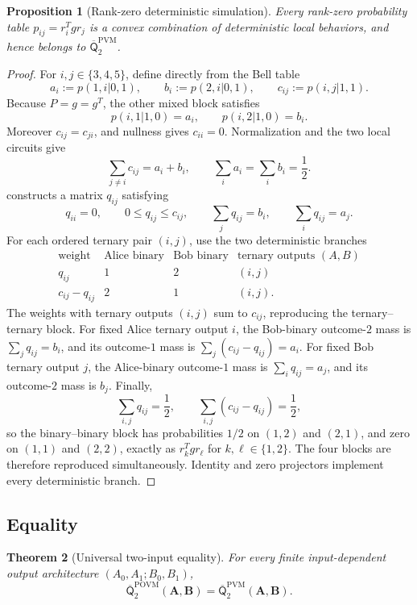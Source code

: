\documentclass[11pt]{article}
\newtheorem{theorem}{Theorem}[section]
\newtheorem{proposition}[theorem]{Proposition}
\theoremstyle{definition}
\newcommand{\Qbar}{\overline{\mathsf Q}}
\newcommand{\POVM}{\mathrm{POVM}}
\newcommand{\PVM}{\mathrm{PVM}}
\begin{document}
\begin{proposition}[Rank-zero deterministic simulation]
\label{prop:rank-zero}
Every rank-zero probability table \(p_{ij}=r_i^Tgr_j\) is a convex
combination of deterministic local behaviors, and hence belongs to
\(\Qbar^{\PVM}_2\).
\end{proposition}

\begin{proof}
For \(i,j\in\{3,4,5\}\), define directly from the Bell table
\[
a_i:=p(1,i|0,1),\qquad b_i:=p(2,i|0,1),\qquad
c_{ij}:=p(i,j|1,1).
\]
Because \(P=g=g^T\), the other mixed block satisfies
\[
p(i,1|1,0)=a_i,\qquad p(i,2|1,0)=b_i.
\]
Moreover \(c_{ij}=c_{ji}\), and nullness gives \(c_{ii}=0\).
Normalization and the two local circuits give
\[
\sum_{j\ne i}c_{ij}=a_i+b_i,\qquad
\sum_i a_i=\sum_i b_i=\frac12.
\]
 constructs a matrix \(q_{ij}\) satisfying
\[
q_{ii}=0,\qquad 0\le q_{ij}\le c_{ij},\qquad
\sum_jq_{ij}=b_i,\qquad
\sum_iq_{ij}=a_j.
\]
For each ordered ternary pair \((i,j)\), use the two deterministic branches
\[
\begin{array}{c|c|c|c}
\text{weight}&\text{Alice binary}&\text{Bob binary}
&\text{ternary outputs }(A,B)\\
\hline
q_{ij}&1&2&(i,j)\\
c_{ij}-q_{ij}&2&1&(i,j).
\end{array}
\]
The weights with ternary outputs \((i,j)\) sum to \(c_{ij}\), reproducing the
ternary--ternary block. For fixed Alice ternary output \(i\), the Bob-binary
outcome-\(2\) mass is \(\sum_jq_{ij}=b_i\), and its outcome-\(1\) mass is
\(\sum_j(c_{ij}-q_{ij})=a_i\). For fixed Bob ternary output \(j\), the
Alice-binary outcome-\(1\) mass is \(\sum_iq_{ij}=a_j\), and its
outcome-\(2\) mass is \(b_j\). Finally,
\[
\sum_{i,j}q_{ij}=\frac12,\qquad
\sum_{i,j}(c_{ij}-q_{ij})=\frac12,
\]
so the binary--binary block has probabilities \(1/2\) on \((1,2)\) and
\((2,1)\), and zero on \((1,1)\) and \((2,2)\), exactly as
\(r_k^Tgr_\ell\) for \(k,\ell\in\{1,2\}\). The four blocks are therefore
reproduced simultaneously. Identity and zero projectors implement every
deterministic branch.
\end{proof}

\subsection{Equality}

\begin{theorem}[Universal two-input equality]
\label{thm:two-input-equality}
For every finite input-dependent output architecture
\((A_0,A_1;B_0,B_1)\),
\[
\boxed{
\Qbar^{\POVM}_2(\mathbf A,\mathbf B)
=
\Qbar^{\PVM}_2(\mathbf A,\mathbf B).
}
\]
\end{theorem}
\end{document}
